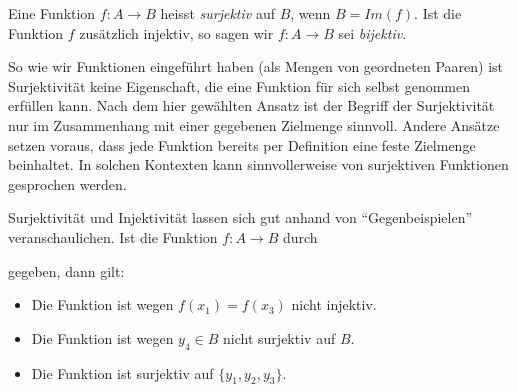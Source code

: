 \begin{df}
    Eine Funktion $f:A\to B$ heisst \textit{surjektiv} auf $B$, wenn $B=Im(f)$. Ist die Funktion $f$ zusätzlich injektiv, so sagen wir $f:A\to B$ sei \textit{bijektiv}.
\end{df}

\begin{wrn}
    So wie wir Funktionen eingeführt haben (als Mengen von geordneten Paaren) ist Surjektivität keine Eigenschaft, die eine Funktion für sich selbst genommen erfüllen kann. Nach dem hier gewählten Ansatz ist der Begriff der Surjektivität nur im Zusammenhang mit einer gegebenen Zielmenge sinnvoll. Andere Ansätze setzen voraus, dass jede Funktion bereits per Definition eine feste Zielmenge beinhaltet. In solchen Kontexten kann sinnvollerweise von surjektiven Funktionen gesprochen werden.
\end{wrn}

\begin{rk}
    Surjektivität und Injektivität lassen sich gut anhand von ``Gegenbeispielen'' veranschaulichen.
    Ist die Funktion $f: A\to B$ durch
    \begin{center}
    \end{center}
    gegeben, dann gilt:
    \begin{itemize}
        \item Die Funktion ist wegen $f(x_1)=f(x_3)$ nicht injektiv.
        \item Die Funktion ist wegen $y_4\in B$ nicht surjektiv auf $B$.
        \item Die Funktion ist surjektiv auf $\{y_1,y_2,y_3\}$.
    \end{itemize}

\end{rk}

